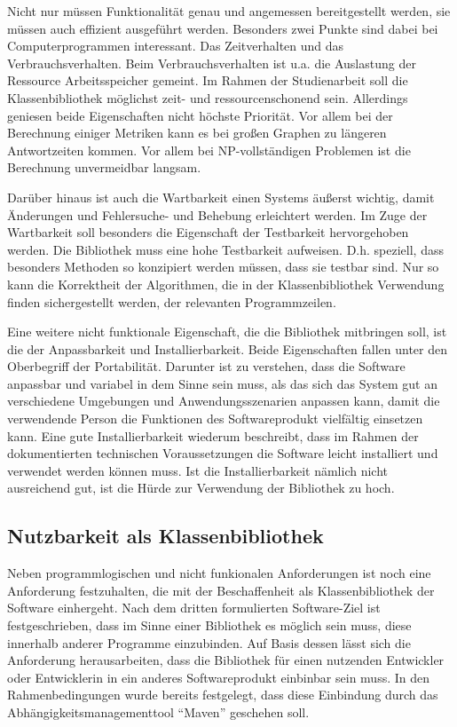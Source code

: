 \documentclass[a4paper,12pt,ngerman,chapterprefix=false,listof=totoc,bibliography=totoc]{scrreprt}
\begin{document}
{{{Nicht nur müssen Funktionalität genau und angemessen bereitgestellt werden, sie müssen auch effizient ausgeführt werden. Besonders zwei Punkte sind dabei bei Computerprogrammen interessant. Das Zeitverhalten und das Verbrauchsverhalten. Beim Verbrauchsverhalten ist u.a. die Auslastung der Ressource Arbeitsspeicher gemeint. Im Rahmen der Studienarbeit soll die Klassenbibliothek möglichst zeit- und ressourcenschonend sein. Allerdings geniesen beide Eigenschaften nicht höchste Priorität. Vor allem bei der Berechnung einiger Metriken kann es bei großen Graphen zu längeren Antwortzeiten kommen. Vor allem bei NP-vollständigen Problemen ist die Berechnung unvermeidbar langsam.

Darüber hinaus ist auch die Wartbarkeit einen Systems äußerst wichtig, damit Änderungen und Fehlersuche- und Behebung erleichtert werden. Im Zuge der Wartbarkeit soll besonders die Eigenschaft der Testbarkeit hervorgehoben werden. Die Bibliothek muss eine hohe Testbarkeit aufweisen. D.h. speziell, dass besonders Methoden so konzipiert werden müssen, dass sie testbar sind. Nur so kann die Korrektheit der Algorithmen, die in der Klassenbibliothek Verwendung finden sichergestellt werden, der relevanten Programmzeilen.

Eine weitere nicht funktionale Eigenschaft, die die Bibliothek mitbringen soll, ist die der Anpassbarkeit und Installierbarkeit. Beide Eigenschaften fallen unter den Oberbegriff der Portabilität. Darunter ist zu verstehen, dass die Software anpassbar und variabel in dem Sinne sein muss, als das sich das System gut an verschiedene Umgebungen und Anwendungsszenarien anpassen kann, damit die verwendende Person die Funktionen des Softwareprodukt vielfältig einsetzen kann. Eine gute Installierbarkeit wiederum beschreibt, dass im Rahmen der dokumentierten technischen Voraussetzungen die Software leicht installiert und verwendet werden können muss. Ist die Installierbarkeit nämlich nicht ausreichend gut, ist die Hürde zur Verwendung der Bibliothek zu hoch. 
}
\subsection{Nutzbarkeit als Klassenbibliothek}
{
Neben programmlogischen und nicht funkionalen Anforderungen ist noch eine Anforderung festzuhalten, die mit der Beschaffenheit als Klassenbibliothek der Software einhergeht. Nach dem dritten formulierten Software-Ziel ist festgeschrieben, dass im Sinne einer Bibliothek es möglich sein muss, diese innerhalb anderer Programme einzubinden. Auf Basis dessen lässt sich die Anforderung herausarbeiten, dass die Bibliothek für einen nutzenden Entwickler oder Entwicklerin in ein anderes Softwareprodukt einbinbar sein muss. In den Rahmenbedingungen wurde bereits festgelegt, dass diese Einbindung durch das Abhängigkeitsmanagementtool "`Maven"' geschehen soll. 
}
}}
\end{document}
